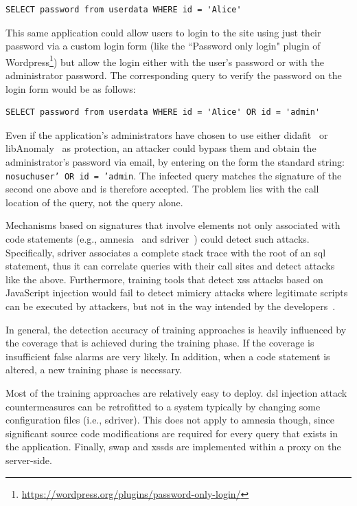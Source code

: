 \documentclass[conference]{IEEEtran}
\begin{document}
\lstset{language=SQL}
\begin{lstlisting}
SELECT password from userdata WHERE id = 'Alice'
\end{lstlisting}

\noindent
This same application could allow users to
login to the site using just their password via a custom login form
(like the ``Password only login" plugin of
Wordpress\footnote{\url{https://wordpress.org/plugins/password-only-login/}})
but allow the login either with the user's password or with
the administrator password. The corresponding query to verify
the password on the login form would be as follows:

\lstset{language=SQL}
\begin{lstlisting}
SELECT password from userdata WHERE id = 'Alice' OR id = 'admin'
\end{lstlisting}

\noindent
Even if the application's administrators have chosen to use
either {\sc didafit}~\cite{LLW02} or
libAnomaly~\cite{VMV05} as protection,
an attacker could bypass them and obtain the
administrator's password via email,
by entering on the form the standard string:
{\tt nosuchuser' OR id = 'admin}. The infected query matches the
signature of the second one above and is therefore accepted.
The problem lies with the call location of the query, not the query alone.

Mechanisms based on signatures that involve elements not only
associated with code statements (e.g.,
{\sc amnesia}~\cite{HO06} and
{\sc sd}river~\cite{MS09})
could detect such attacks. Specifically, {\sc sd}river
associates a complete stack trace with the root of an {\sc sql}
statement, thus it can correlate queries with their call sites and
detect attacks like the above. Furthermore, training
tools that detect {\sc xss} attacks based on JavaScript injection
would fail to detect mimicry attacks where legitimate scripts can be
executed by attackers, but not in the way intended by the
developers~\cite{APKLM10}.

In general, the detection accuracy of training approaches is heavily
influenced by the coverage that is achieved during the training phase. If
the coverage is insufficient false alarms are very likely. In
addition, when a code statement is altered, a new training phase is
necessary.

Most of the training approaches are relatively easy to deploy.
{\sc dsl} injection attack countermeasures
can be retrofitted to a system typically by changing
some configuration files (i.e., {\sc sd}river).
This does not apply to {\sc amnesia}
though, since significant source code
modifications are required for every query that exists
in the application. Finally, {\sc swap} and {\sc xssds}
are implemented within a proxy on the server-side.
\end{document}
